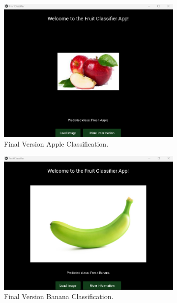 \documentclass[conference]{IEEEtran}
\begin{document}
\begin{figure}[h]
    \hfill
    \begin{subfigure}[b]{0.48\linewidth}
        \centering
        \includegraphics[width=\linewidth]{Mlayer appel3.png}
        \caption{Final Version Apple Classification.}
        \label{figFB}
    \end{subfigure}
    \hfill
    \begin{subfigure}[b]{0.48\linewidth}
        \centering
        \includegraphics[width=\linewidth]{Mlayer banana1.png}
        \caption{Final Version Banana Classification.}
        \label{figFA}
    \end{subfigure}
    \hfill
    \begin{subfigure}[b]{0.48\linewidth}

\end{subfigure}
\end{figure}
\end{document}
